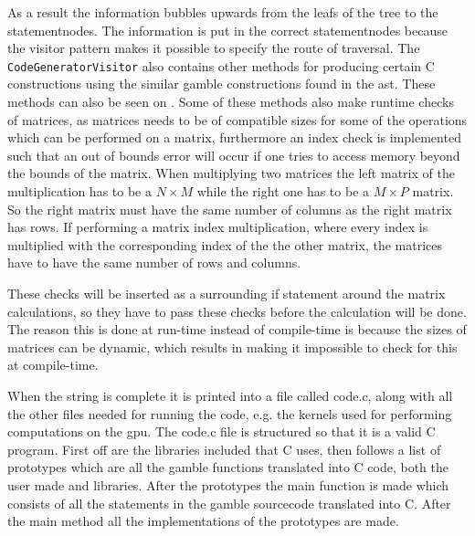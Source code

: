 As a result the information bubbles upwards from the leafs of the tree to the statementnodes.
The information is put in the correct statementnodes because the visitor pattern makes it possible to specify the route of traversal.
The \texttt{CodeGeneratorVisitor} also contains other methods for producing certain C constructions using the similar \gls{gamble} constructions found in the \acrshort{ast}.
These methods can also be seen on .
Some of these methods also make runtime checks of matrices, as matrices needs to be of compatible sizes for some of the operations which can be performed on a matrix, furthermore an index check is implemented such that an out of bounds error will occur if one tries to access memory beyond the bounds of the matrix.
When multiplying two matrices the left matrix of the multiplication has to be a $ N \times M $ while the right one has to be a $ M \times P $ matrix.
So the right matrix must have the same number of columns as the right matrix has rows.
If performing a matrix index multiplication, where every index is multiplied with the corresponding index of the the other matrix, the matrices have to have the same number of rows and columns.

These checks will be inserted as a surrounding if statement around the matrix calculations, so they have to pass these checks before the calculation will be done.
The reason this is done at run-time instead of compile-time is because the sizes of matrices can be dynamic, which results in making it impossible to check for this at compile-time.

When the string is complete it is printed into a file called code.c, along with all the other files needed for running the code, e.g. the kernels used for performing computations on the \acrshort{gpu}.
The code.c file is structured so that it is a valid C program.
First off are the libraries included that C uses, then follows a list of prototypes which are all the \gls{gamble} functions translated into C code, both the user made and libraries.
After the prototypes the main function is made which consists of all the statements in the \gls{gamble} sourcecode translated into C.
After the main method all the implementations of the prototypes are made.